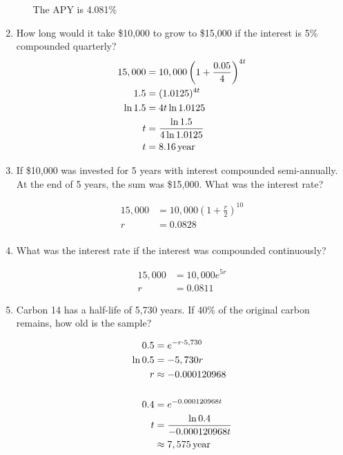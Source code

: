 \documentclass{exam}
\begin{document}
\begin{enumerate}
\begin{enumerate}[a]
          The APY is 4.081\%

      \end{enumerate}

    \item
      How long would it take \$10,000 to grow to \$15,000 if the interest is 5\% compounded quarterly?
      \begin{align*}
        15,000  &= 10,000 \left( 1 + \frac{0.05}{4} \right)^{4t} \\
        1.5     &= (1.0125)^{4t} \\
        \ln 1.5 &= 4t \ln 1.0125 \\
        t       &= \frac{\ln 1.5}{4 \ln 1.0125} \\
        t       &= \unit[8.16]{year} \\
      \end{align*}

    \item
      If \$10,000 was invested for 5 years with interest compounded semi-annually.  At the end of 5 years, the sum
      was \$15,000.  What was the interest rate?

      \begin{align*}
        15,000 &= 10,000 \left( 1 + \frac{r}{2} \right)^{10} \\
        r      &= 0.0828 \\
      \end{align*}

    \item
      What was the interest rate if the interest was compounded continuously?

      \begin{align*}
        15,000 &= 10,000 e^{5r} \\
        r      &= 0.0811
      \end{align*}

    \item
      Carbon 14 has a half-life of 5,730 years.  If 40\% of the original carbon remains, how old is the sample?

      \begin{align*}
        0.5     &= e^{-r \cdot 5,730} \\
        \ln 0.5 &= -5,730 r \\
        r       &\approx -0.000120968 \\
        \\
        0.4     &= e^{-0.000120968 t} \\
        t       &= \frac{\ln 0.4}{-0.000120968 t} \\
                &\approx \unit[7,575]{year} \\
      \end{align*}

  \end{enumerate}
\end{document}

